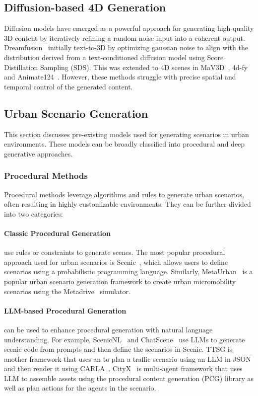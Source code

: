 \documentclass{article}
\begin{document}
\subsection{Diffusion-based 4D Generation}

Diffusion models have emerged as a powerful approach for generating high-quality 3D content by iteratively refining a random noise input into a coherent output. Dreamfusion~\cite{poole2022dreamfusion} initially text-to-3D by optimizing gaussian noise to align with the distribution derived from a text-conditioned diffusion model using Score Distillation Sampling (SDS). This was extended to 4D scenes in MaV3D~\cite{singer2023text}, 4d-fy~\cite{bahmani20244d} and Animate124~\cite{zhao2023animate124}. However, these methods struggle with precise spatial and temporal control of the generated content.

\subsection{Urban Scenario Generation}

This section discusses pre-existing models used for generating scenarios in urban environments. These models can be broadly classified into procedural and deep generative approaches.

\subsubsection{Procedural Methods}

Procedural methods leverage algorithms and rules to generate urban scenarios, often resulting in highly customizable environments. They can be further divided into two categories:

\paragraph{Classic Procedural Generation} use rules or constraints to generate scenes. The most popular procedural approach used for urban scenarios is Scenic~\cite{fremont2019scenic}, which allows users to define scenarios using a probabilistic programming language. Similarly, MetaUrban~\cite{wu2024metaurban} is a popular urban scenario generation framework to create urban micromobility scenarios using the Metadrive~\cite{li2022metadrive} simulator.

\paragraph{LLM-based Procedural Generation} can be used to enhance procedural generation with natural language understanding. For example, ScenicNL~\cite{elmaaroufi2024scenicnl} and ChatScene~\cite{zhang2024chatscene} use LLMs to generate scenic code from prompts and then define the scenarios in Scenic. TTSG\cite{ruan2024traffic} is another framework that uses an to plan a traffic scenario using an LLM in JSON and then render it using CARLA~\cite{dosovitskiy2017carla}. CityX~\cite{zhang2024cityx} is multi-agent framework that uses LLM to assemble assets using the procedural content generation (PCG) library as well as plan actions for the agents in the scenario.
\end{document}
